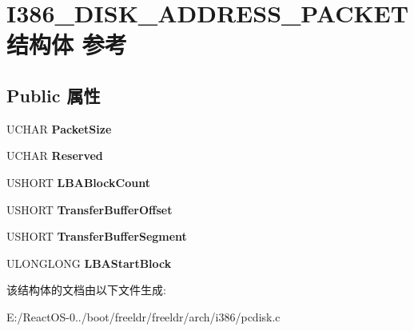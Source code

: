 \hypertarget{struct_i386___d_i_s_k___a_d_d_r_e_s_s___p_a_c_k_e_t}{}\section{I386\+\_\+\+D\+I\+S\+K\+\_\+\+A\+D\+D\+R\+E\+S\+S\+\_\+\+P\+A\+C\+K\+E\+T结构体 参考}
\label{struct_i386___d_i_s_k___a_d_d_r_e_s_s___p_a_c_k_e_t}
\subsection*{Public 属性}
\begin{DoxyCompactItemize}
\item 
\mbox{\label{struct_i386___d_i_s_k___a_d_d_r_e_s_s___p_a_c_k_e_t_a45065fb573facc7895e5169f624b0c55}} 
U\+C\+H\+AR {\bfseries Packet\+Size}
\item 
\mbox{\label{struct_i386___d_i_s_k___a_d_d_r_e_s_s___p_a_c_k_e_t_adae19dfaef5c420cc5c7e5a58e89f3e3}} 
U\+C\+H\+AR {\bfseries Reserved}
\item 
\mbox{\label{struct_i386___d_i_s_k___a_d_d_r_e_s_s___p_a_c_k_e_t_ab0deee4933a161abf82b5eafaef76540}} 
U\+S\+H\+O\+RT {\bfseries L\+B\+A\+Block\+Count}
\item 
\mbox{\label{struct_i386___d_i_s_k___a_d_d_r_e_s_s___p_a_c_k_e_t_ab0a4c524e74e72f7a1e52937e80150ae}} 
U\+S\+H\+O\+RT {\bfseries Transfer\+Buffer\+Offset}
\item 
\mbox{\label{struct_i386___d_i_s_k___a_d_d_r_e_s_s___p_a_c_k_e_t_a76f7fa1af557b49ffeaaeeccdbcefdd4}} 
U\+S\+H\+O\+RT {\bfseries Transfer\+Buffer\+Segment}
\item 
\mbox{\label{struct_i386___d_i_s_k___a_d_d_r_e_s_s___p_a_c_k_e_t_a9567fe6a13abe49ff155ad59771786c9}} 
U\+L\+O\+N\+G\+L\+O\+NG {\bfseries L\+B\+A\+Start\+Block}
\end{DoxyCompactItemize}


该结构体的文档由以下文件生成\+:\begin{DoxyCompactItemize}
\item 
E\+:/\+React\+O\+S-\/0../boot/freeldr/freeldr/arch/i386/pcdisk.\+c\end{DoxyCompactItemize}
